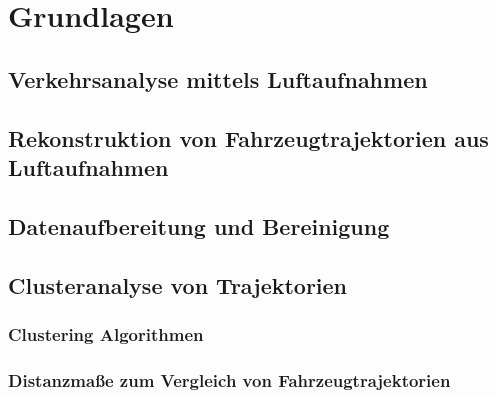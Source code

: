 
\chapter{Grundlagen}
\label{cha:grundlagen}

\section{Verkehrsanalyse mittels Luftaufnahmen}
\label{sec:traffic_analysis}

\section{Rekonstruktion von Fahrzeugtrajektorien aus Luftaufnahmen}
\label{sec:position_extraction}

\section{Datenaufbereitung und Bereinigung}
\label{sec:tra_preprocessing}

\section{Clusteranalyse von Trajektorien}
\label{sec:tra_clustering}

\subsection{Clustering Algorithmen}
\label{sec:cluster_algos}

\subsection{Distanzmaße zum Vergleich von Fahrzeugtrajektorien}
\label{sec:distance_measures}

